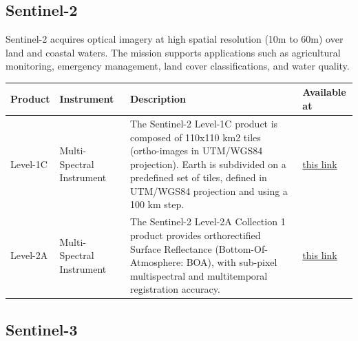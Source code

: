 \documentclass[
  letterpaper,
  DIV=11,
  numbers=noendperiod]{scrreprt}
\begin{document}
\subsection{Sentinel-2}\label{sentinel-2}

Sentinel-2 acquires optical imagery at high spatial resolution (10m to
60m) over land and coastal waters. The mission supports applications
such as agricultural monitoring, emergency management, land cover
classifications, and water quality.

\begin{longtable}[]{@{}
  >{\raggedright\arraybackslash}p{}
  >{\raggedright\arraybackslash}p{}
  >{\raggedright\arraybackslash}p{}
  >{\raggedright\arraybackslash}p{}@{}}
\toprule\noalign{}
\begin{minipage}[b]{\linewidth}\raggedright
Product
\end{minipage} & \begin{minipage}[b]{\linewidth}\raggedright
Instrument
\end{minipage} & \begin{minipage}[b]{\linewidth}\raggedright
Description
\end{minipage} & \begin{minipage}[b]{\linewidth}\raggedright
Available at
\end{minipage} \\
\midrule\noalign{}
\endhead
\bottomrule\noalign{}
\endlastfoot
Level-1C & Multi-Spectral Instrument & The Sentinel-2 Level-1C product
is composed of 110x110 km2 tiles (ortho-images in UTM/WGS84 projection).
Earth is subdivided on a predefined set of tiles, defined in UTM/WGS84
projection and using a 100 km step. &
\href{https://stac.browser.user.eopf.eodc.eu/collections/sentinel-2-l1c}{this
link} \\
Level-2A & Multi-Spectral Instrument & The Sentinel-2 Level-2A
Collection 1 product provides orthorectified Surface Reflectance
(Bottom-Of-Atmosphere: BOA), with sub-pixel multispectral and
multitemporal registration accuracy. &
\href{https://stac.browser.user.eopf.eodc.eu/collections/sentinel-2-l2a}{this
link} \\
\end{longtable}

\subsection{Sentinel-3}\label{sentinel-3}
\end{document}
